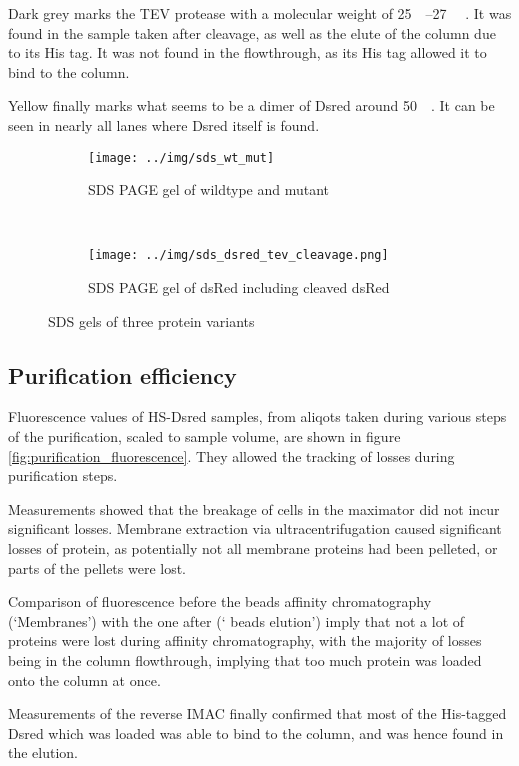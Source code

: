 Dark grey marks the TEV protease with a molecular weight of
\SIrange{25}{27}{\kilo\Da} \cite{pdb}. It was found in the sample taken after
cleavage, as well as the elute of the column due to its His tag. It was not
found in the flowthrough, as its His tag allowed it to bind to the column.

Yellow finally marks what seems to be a dimer of Dsred around
\SI{50}{\kilo\Da}. It can be seen in nearly all lanes where Dsred itself is
found.

\begin{figure}
    \centering
    \begin{subfigure}{0.45\textwidth}
        \texttt{[image: ../img/sds\_wt\_mut]}
        \caption{SDS PAGE gel of wildtype and mutant}
        \label{fig:sds_wt_mut}
    \end{subfigure}
    ~
    \begin{subfigure}{0.45\textwidth}
        \texttt{[image: ../img/sds\_dsred\_tev\_cleavage.png]}
        \caption{SDS PAGE gel of dsRed including cleaved dsRed}
        \label{fig:sds_dsred_cleaved}
    \end{subfigure}
    \caption{SDS gels of three protein variants}
    \label{fig:sds}
\end{figure}

\subsection{Purification efficiency}

Fluorescence values of HS-Dsred samples, from aliqots taken during various
steps of the purification, scaled to sample volume, are shown in figure
\ref{fig:purification_fluorescence}. They allowed the tracking of losses during
purification steps.

Measurements showed that the breakage of cells in the maximator did not incur
significant losses. Membrane extraction via ultracentrifugation caused
significant losses of protein, as potentially not all membrane proteins had
been pelleted, or parts of the pellets were lost.

Comparison of fluorescence before the  beads affinity chromatography
(`Membranes') with the one after (` beads elution') imply that not a lot
of proteins were lost during affinity chromatography, with the majority of
losses being in the column flowthrough, implying that too much protein was
loaded onto the column at once.

Measurements of the reverse IMAC finally confirmed that most of the His-tagged
Dsred which was loaded was able to bind to the column, and was hence found in
the elution.

